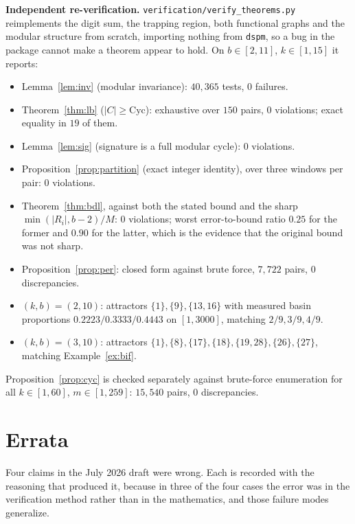 \documentclass[11pt]{article}
\theoremstyle{definition}
\theoremstyle{remark}
\newcommand{\Cyc}{\mathrm{Cyc}}
\begin{document}
\medskip
\noindent\textbf{Independent re-verification.} \texttt{verification/verify\_theorems.py} reimplements the digit sum, the trapping region, both functional graphs and the modular structure from scratch, importing nothing from \texttt{dspm}, so a bug in the package cannot make a theorem appear to hold. On $b \in [2,11]$, $k \in [1,15]$ it reports:
\begin{itemize}
\item Lemma~\ref{lem:inv} (modular invariance): $40{,}365$ tests, 0 failures.
\item Theorem~\ref{thm:lb} ($|C| \ge \Cyc$): exhaustive over $150$ pairs, 0 violations; exact equality in $19$ of them.
\item Lemma~\ref{lem:sig} (signature is a full modular cycle): 0 violations.
\item Proposition~\ref{prop:partition} (exact integer identity), over three windows per pair: 0 violations.
\item Theorem~\ref{thm:bdl}, against both the stated bound and the sharp $\min(|R_i|,b-2)/M$: 0 violations; worst error-to-bound ratio $0.25$ for the former and $0.90$ for the latter, which is the evidence that the original bound was not sharp.
\item Proposition~\ref{prop:per}: closed form against brute force, $7{,}722$ pairs, 0 discrepancies.
\item $(k,b)=(2,10)$: attractors $\{1\},\{9\},\{13,16\}$ with measured basin proportions $0.2223/0.3333/0.4443$ on $[1,3000]$, matching $2/9, 3/9, 4/9$.
\item $(k,b)=(3,10)$: attractors $\{1\},\{8\},\{17\},\{18\},\{19,28\},\{26\},\{27\}$, matching Example~\ref{ex:bif}.
\end{itemize}

Proposition~\ref{prop:cyc} is checked separately against brute-force enumeration for all $k \in [1,60]$, $m \in [1,259]$: $15{,}540$ pairs, 0 discrepancies.

\section{Errata}\label{app:errata}

Four claims in the July 2026 draft were wrong. Each is recorded with the reasoning that produced it, because in three of the four cases the error was in the verification method rather than in the mathematics, and those failure modes generalize.
\end{document}
